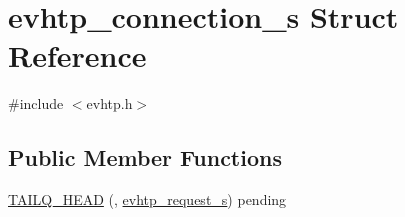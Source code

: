 \hypertarget{structevhtp__connection__s}{\section{evhtp\-\_\-connection\-\_\-s \-Struct \-Reference}
\label{structevhtp__connection__s}
}


{\ttfamily \#include $<$evhtp.\-h$>$}

\subsection*{\-Public \-Member \-Functions}
\begin{DoxyCompactItemize}
\item 
\hyperlink{structevhtp__connection__s_a52ddde4d8c2748fe93aa08c00d604290}{\-T\-A\-I\-L\-Q\-\_\-\-H\-E\-A\-D} (, \hyperlink{structevhtp__request__s}{evhtp\-\_\-request\-\_\-s}) pending
\end{DoxyCompactItemize}
